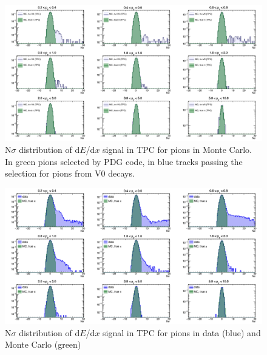 \begin{figure}[!h]
 \centering
 \includegraphics[angle=0, width=15cm]{./FigCap5/PionTPC_MC.png}
 \caption{N$\sigma$ distribution of d$E$/d$x$ signal in TPC for pions in Monte Carlo. In green pions selected by PDG code, in blue tracks passing the selection for pions from V0 decays.}
 \label{fig:MCPionsTPC} 
\end{figure}

\begin{figure}[!h]
 \centering
 \includegraphics[angle=0, width=15cm]{./FigCap5/PionTPC_DataMC.png}
 \caption{N$\sigma$ distribution of d$E$/d$x$ signal in TPC for pions in data (blue) and Monte Carlo (green)}
 \label{fig:DataPionsTPC} 
\end{figure}

